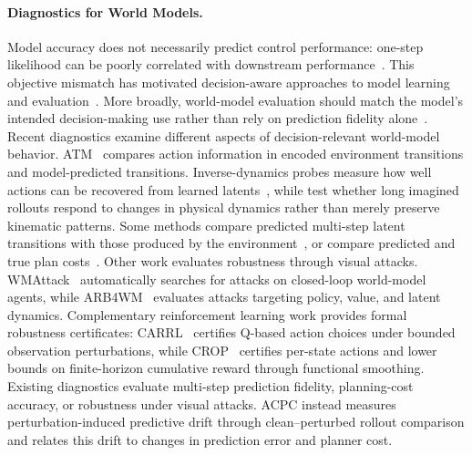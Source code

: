 \documentclass{article}
\begin{document}
\paragraph{Diagnostics for World Models.}
Model accuracy does not necessarily predict control performance:
one-step likelihood can be poorly correlated with downstream
performance~\citep{lambert2020objective}.
This objective mismatch has motivated decision-aware approaches to model
learning and evaluation~\citep{wei2024objectivemismatch}.
More broadly, world-model evaluation should match the model's intended
decision-making use rather than rely on prediction fidelity
alone~\citep{yu2026worldmodelevaluation}.
Recent diagnostics examine different aspects of decision-relevant world-model
behavior. ATM~\citep{chen2026atm} compares action information in encoded
environment transitions and model-predicted transitions. Inverse-dynamics
probes measure how well actions can be recovered from learned
latents~\citep{yeom2026actionrelevant}, while
\citet{schaefer2026kinematic} test whether long imagined rollouts respond to
changes in physical dynamics rather than merely preserve kinematic patterns.
Some methods compare predicted multi-step latent transitions with those
produced by the environment~\citep{vakalis2026operator}, or compare predicted
and true plan costs~\citep{you2026controlpredictability}.
Other work evaluates robustness through visual attacks.
\mbox{WMAttack}~\citep{guo2026wmattack} automatically searches for attacks on
closed-loop world-model agents, while ARB4WM~\citep{zhang2026arb4wm} evaluates
attacks targeting policy, value, and latent dynamics.
Complementary reinforcement learning work provides formal robustness certificates:
CARRL~\citep{lutjens2020certifiedrl} certifies Q-based action choices under
bounded observation perturbations, while CROP~\citep{wu2022crop} certifies
per-state actions and lower bounds on finite-horizon cumulative reward through
functional smoothing.
Existing diagnostics evaluate multi-step prediction fidelity, planning-cost accuracy, or robustness under visual attacks. ACPC instead measures perturbation-induced predictive drift through clean--perturbed rollout comparison and relates this drift to changes in prediction error and planner cost.
\end{document}
